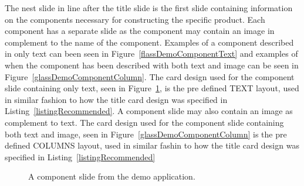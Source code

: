 The nest slide in line after the title slide is the first slide containing information on the components necessary for constructing the specific product. Each component has a separate slide as the component may contain an image in complement to the name of the component. Examples of a component described in only text can been seen in Figure~\ref{flassDemoComponentText} and examples of when the component has been described with both text and image can be seen in Figure~\ref{glassDemoComponentColumn}.
The card design used for the component slide containing only text, seen in Figure~\ref{glassDemoComponentText}, is the pre defined TEXT layout, used in similar fashion to how the title card design was specified in Listing~\ref{listingRecommended}. A component slide may also contain an image as complement to text. The card design used for the component slide containing both text and image, seen in Figure~\ref{glassDemoComponentColumn} is the pre defined COLUMNS layout, used in similar fashin to how the title card design was specified in Listing~\ref{listingRecommended}

		\begin{figure}[ht!]
		\centering
   		 \qquad
   		 \qquad
		\caption{A component slide from the demo application.}
		\label{glassDemoComponentText}
	\end{figure}

